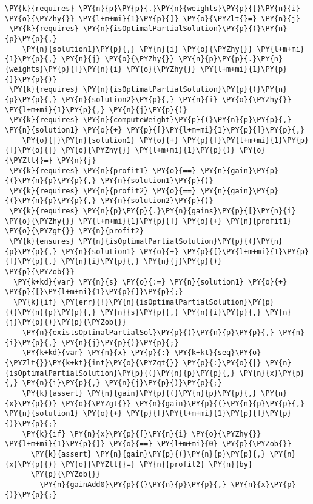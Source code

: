 \begin{sloppypar}
\begin{Verbatim}[commandchars=\\\{\}]
 \PY{k}{requires} \PY{n}{p}\PY{p}{.}\PY{n}{weights}\PY{p}{[}\PY{n}{i} \PY{o}{\PYZhy{}} \PY{l+m+mi}{1}\PY{p}{]} \PY{o}{\PYZlt{}=} \PY{n}{j}
 \PY{k}{requires} \PY{n}{isOptimalPartialSolution}\PY{p}{(}\PY{n}{p}\PY{p}{,} 
    \PY{n}{solution1}\PY{p}{,} \PY{n}{i} \PY{o}{\PYZhy{}} \PY{l+m+mi}{1}\PY{p}{,} \PY{n}{j} \PY{o}{\PYZhy{}} \PY{n}{p}\PY{p}{.}\PY{n}{weights}\PY{p}{[}\PY{n}{i} \PY{o}{\PYZhy{}} \PY{l+m+mi}{1}\PY{p}{]}\PY{p}{)}
 \PY{k}{requires} \PY{n}{isOptimalPartialSolution}\PY{p}{(}\PY{n}{p}\PY{p}{,} \PY{n}{solution2}\PY{p}{,} \PY{n}{i} \PY{o}{\PYZhy{}} \PY{l+m+mi}{1}\PY{p}{,} \PY{n}{j}\PY{p}{)}
 \PY{k}{requires} \PY{n}{computeWeight}\PY{p}{(}\PY{n}{p}\PY{p}{,} \PY{n}{solution1} \PY{o}{+} \PY{p}{[}\PY{l+m+mi}{1}\PY{p}{]}\PY{p}{,} 
    \PY{o}{|}\PY{n}{solution1} \PY{o}{+} \PY{p}{[}\PY{l+m+mi}{1}\PY{p}{]}\PY{o}{|} \PY{o}{\PYZhy{}} \PY{l+m+mi}{1}\PY{p}{)} \PY{o}{\PYZlt{}=} \PY{n}{j}
 \PY{k}{requires} \PY{n}{profit1} \PY{o}{==} \PY{n}{gain}\PY{p}{(}\PY{n}{p}\PY{p}{,} \PY{n}{solution1}\PY{p}{)}
 \PY{k}{requires} \PY{n}{profit2} \PY{o}{==} \PY{n}{gain}\PY{p}{(}\PY{n}{p}\PY{p}{,} \PY{n}{solution2}\PY{p}{)}
 \PY{k}{requires} \PY{n}{p}\PY{p}{.}\PY{n}{gains}\PY{p}{[}\PY{n}{i} \PY{o}{\PYZhy{}} \PY{l+m+mi}{1}\PY{p}{]} \PY{o}{+} \PY{n}{profit1} \PY{o}{\PYZgt{}} \PY{n}{profit2}
 \PY{k}{ensures} \PY{n}{isOptimalPartialSolution}\PY{p}{(}\PY{n}{p}\PY{p}{,} \PY{n}{solution1} \PY{o}{+} \PY{p}{[}\PY{l+m+mi}{1}\PY{p}{]}\PY{p}{,} \PY{n}{i}\PY{p}{,} \PY{n}{j}\PY{p}{)}
\PY{p}{\PYZob{}}
  \PY{k+kd}{var} \PY{n}{s} \PY{o}{:=} \PY{n}{solution1} \PY{o}{+} \PY{p}{[}\PY{l+m+mi}{1}\PY{p}{]}\PY{p}{;}
  \PY{k}{if} \PY{err}{!}\PY{n}{isOptimalPartialSolution}\PY{p}{(}\PY{n}{p}\PY{p}{,} \PY{n}{s}\PY{p}{,} \PY{n}{i}\PY{p}{,} \PY{n}{j}\PY{p}{)}\PY{p}{\PYZob{}}
    \PY{n}{existsOptimalPartialSol}\PY{p}{(}\PY{n}{p}\PY{p}{,} \PY{n}{i}\PY{p}{,} \PY{n}{j}\PY{p}{)}\PY{p}{;}
    \PY{k+kd}{var} \PY{n}{x} \PY{p}{:} \PY{k+kt}{seq}\PY{o}{\PYZlt{}}\PY{k+kt}{int}\PY{o}{\PYZgt{}} \PY{p}{:}\PY{o}{|} \PY{n}{isOptimalPartialSolution}\PY{p}{(}\PY{n}{p}\PY{p}{,} \PY{n}{x}\PY{p}{,} \PY{n}{i}\PY{p}{,} \PY{n}{j}\PY{p}{)}\PY{p}{;}
    \PY{k}{assert} \PY{n}{gain}\PY{p}{(}\PY{n}{p}\PY{p}{,} \PY{n}{x}\PY{p}{)} \PY{o}{\PYZgt{}} \PY{n}{gain}\PY{p}{(}\PY{n}{p}\PY{p}{,} \PY{n}{solution1} \PY{o}{+} \PY{p}{[}\PY{l+m+mi}{1}\PY{p}{]}\PY{p}{)}\PY{p}{;}
    \PY{k}{if} \PY{n}{x}\PY{p}{[}\PY{n}{i} \PY{o}{\PYZhy{}} \PY{l+m+mi}{1}\PY{p}{]} \PY{o}{==} \PY{l+m+mi}{0} \PY{p}{\PYZob{}}
      \PY{k}{assert} \PY{n}{gain}\PY{p}{(}\PY{n}{p}\PY{p}{,} \PY{n}{x}\PY{p}{)} \PY{o}{\PYZlt{}=} \PY{n}{profit2} \PY{n}{by} 
      \PY{p}{\PYZob{}}
        \PY{n}{gainAdd0}\PY{p}{(}\PY{n}{p}\PY{p}{,} \PY{n}{x}\PY{p}{)}\PY{p}{;}

\end{Verbatim}
\end{sloppypar}
